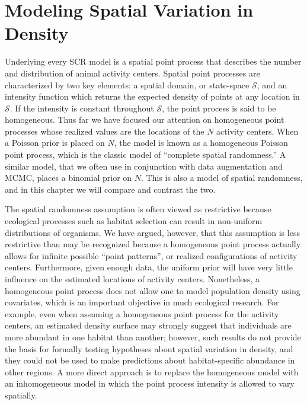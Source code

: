 \chapter{
Modeling Spatial Variation in Density
}
\label{chapt.state-space}

\vspace{0.3cm}

Underlying every SCR model is a spatial point process
that describes the number and distribution of animal activity
centers. Spatial point processes are characterized by two key
elements: a spatial domain, or state-space $\mathcal{S}$, and an
intensity function which returns the
expected density of points at any location in $\mathcal{S}$.
If the intensity is constant throughout $\mathcal{S}$,
the point process is said to be homogeneous.
Thus far we have focused our attention on homogeneous %
point processes whose realized values are the locations of the $N$
activity centers.
When a Poisson prior is
placed on $N$, the model is known as a homogeneous Poisson point process, which
is the classic model of ``complete spatial randomness.''
A similar model, that we often use in conjunction with data
augmentation and MCMC, places a binomial prior on $N$. This is also a
model of spatial randomness, and in this chapter we will compare and
contrast the two.

The spatial randomness assumption is often viewed as restrictive
because ecological processes such as
habitat selection can result in non-uniform
distributions of organisms. We have argued, however, that this
assumption is less restrictive than may be recognized because a
homogeneous point process actually allows for infinite
possible ``point patterns'', or realized configurations of activity
centers. Furthermore, given enough data,
the uniform prior will have very little influence on the estimated
locations of activity centers. Nonetheless, a homogeneous point
process does not allow one to model population density using
covariates, which is an important objective in much ecological research.
For example, even when assuming a homogeneous point process for
the activity centers, an estimated density surface may strongly
suggest that individuals are more abundant in one habitat than
another; however, such results do not provide the basis for formally testing
hypotheses about spatial variation in density, and they could not be
used to make predictions about habitat-specific abundance in other
regions. A more direct approach is to replace the homogeneous model
with an inhomogeneous model in which the point process intensity
is allowed to vary spatially.

